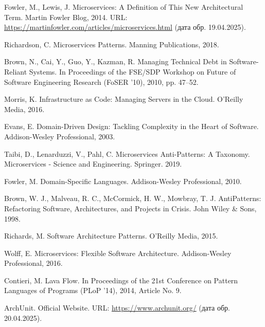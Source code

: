 \documentclass[a4paper,article,14pt]{extarticle}
\begin{document}


\tableofcontents
\pagebreak









\begin{thebibliography}{1}

 Fowler, M., Lewis, J. Microservices: A Definition of This New Architectural Term. Martin Fowler Blog, 2014. URL: \url{https://martinfowler.com/articles/microservices.html} (дата обр. 19.04.2025).

 Richardson, C. Microservices Patterns. Manning Publications, 2018.

 Brown, N., Cai, Y., Guo, Y., Kazman, R. Managing Technical Debt in Software-Reliant Systems. In Proceedings of the FSE/SDP Workshop on Future of Software Engineering Research (FoSER '10), 2010, pp. 47–52.

 Morris, K. Infrastructure as Code: Managing Servers in the Cloud. O'Reilly Media, 2016.

 Evans, E. Domain-Driven Design: Tackling Complexity in the Heart of Software. Addison-Wesley Professional, 2003.

 Taibi, D., Lenarduzzi, V., Pahl, C. Microservices Anti-Patterns: A Taxonomy. Microservices - Science and Engineering. Springer. 2019.

 Fowler, M. Domain-Specific Languages. Addison-Wesley Professional, 2010.

 Brown, W. J., Malveau, R. C., McCormick, H. W., Mowbray, T. J. AntiPatterns: Refactoring Software, Architectures, and Projects in Crisis. John Wiley \& Sons, 1998.

 Richards, M. Software Architecture Patterns. O'Reilly Media, 2015.

 Wolff, E. Microservices: Flexible Software Architecture. Addison-Wesley Professional, 2016.

 Contieri, M. Lava Flow. In Proceedings of the 21st Conference on Pattern Languages of Programs (PLoP '14), 2014, Article No. 9.

 ArchUnit. Official Website. URL: \url{https://www.archunit.org/} (дата обр. 20.04.2025).


\end{thebibliography}
\end{document}
